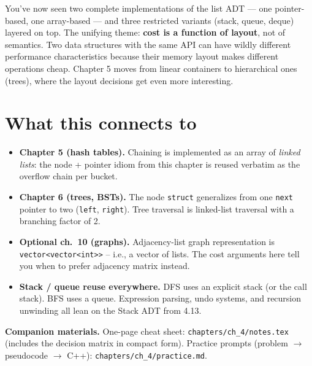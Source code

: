 \documentclass[11pt]{article}
\begin{document}
\begin{ideabox}
You've now seen two complete implementations of the list ADT
--- one pointer-based, one array-based --- and three restricted
variants (stack, queue, deque) layered on top. The unifying
theme: \textbf{cost is a function of layout}, not of semantics.
Two data structures with the same API can have wildly different
performance characteristics because their memory layout makes
different operations cheap. Chapter 5 moves from linear
containers to hierarchical ones (trees), where the layout
decisions get even more interesting.
\end{ideabox}

\section*{What this connects to}

\begin{notebox}
\begin{itemize}
    \item \textbf{Chapter 5 (hash tables).} Chaining is implemented as an
    array of \emph{linked lists}: the node + pointer idiom from this
    chapter is reused verbatim as the overflow chain per bucket.
    \item \textbf{Chapter 6 (trees, BSTs).} The node \texttt{struct}
    generalizes from one \texttt{next} pointer to two (\texttt{left},
    \texttt{right}). Tree traversal is linked-list traversal with a
    branching factor of 2.
    \item \textbf{Optional ch.~10 (graphs).} Adjacency-list graph
    representation is \texttt{vector<vector<int>>} -- i.e., a vector of
    lists. The cost arguments here tell you when to prefer adjacency
    matrix instead.
    \item \textbf{Stack / queue reuse everywhere.} DFS uses an explicit
    stack (or the call stack). BFS uses a queue. Expression parsing, undo
    systems, and recursion unwinding all lean on the Stack ADT from 4.13.
\end{itemize}
\end{notebox}

\textbf{Companion materials.} One-page cheat sheet:
\texttt{chapters/ch\_4/notes.tex} (includes the decision matrix in compact
form). Practice prompts (problem $\to$ pseudocode $\to$ C++):
\texttt{chapters/ch\_4/practice.md}.
\end{document}
